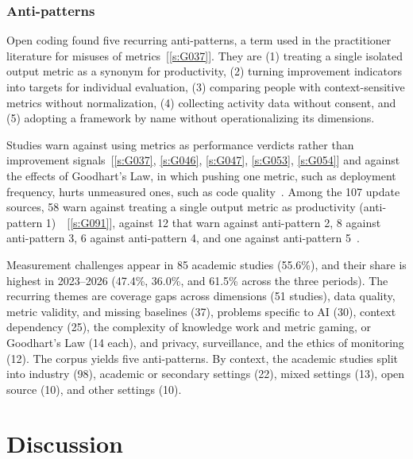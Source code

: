 \documentclass[preprint,number]{elsarticle}
\newcommand{\refG}[1]{\ref{s:#1}}
\begin{document}
\subsubsection{Anti-patterns}

Open coding found five recurring anti-patterns, a term used in the practitioner literature for misuses of metrics~[\refG{G037}]. They are (1) treating a single isolated output metric as a synonym for productivity, (2) turning improvement indicators into targets for individual evaluation, (3) comparing people with context-sensitive metrics without normalization, (4) collecting activity data without consent, and (5) adopting a framework by name without operationalizing its dimensions.

Studies warn against using metrics as performance verdicts rather than improvement signals~[\refG{G037}, \refG{G046}, \refG{G047}, \refG{G053}, \refG{G054}] and against the effects of Goodhart's Law, in which pushing one metric, such as deployment frequency, hurts unmeasured ones, such as code quality~\cite{P0021, P0027, P0249}. Among the 107 update sources, 58 warn against treating a single output metric as productivity (anti-pattern 1)~\cite{P2100, P2103}~[\refG{G091}], against 12 that warn against anti-pattern 2, 8 against anti-pattern 3, 6 against anti-pattern 4, and one against anti-pattern 5~\cite{P2016}.

\begin{tcolorbox}[colback=gray!5, colframe=gray!50, title={\textbf{Summary of RQ4}}, fonttitle=\small]
\footnotesize
Measurement challenges appear in 85 academic studies (55.6\%), and their share is highest in 2023--2026 (47.4\%, 36.0\%, and 61.5\% across the three periods). The recurring themes are coverage gaps across dimensions (51 studies), data quality, metric validity, and missing baselines (37), problems specific to AI (30), context dependency (25), the complexity of knowledge work and metric gaming, or Goodhart's Law (14 each), and privacy, surveillance, and the ethics of monitoring (12). The corpus yields five anti-patterns. By context, the academic studies split into industry (98), academic or secondary settings (22), mixed settings (13), open source (10), and other settings (10).
\end{tcolorbox}


\section{Discussion}
\label{sec:discussion}
\end{document}
